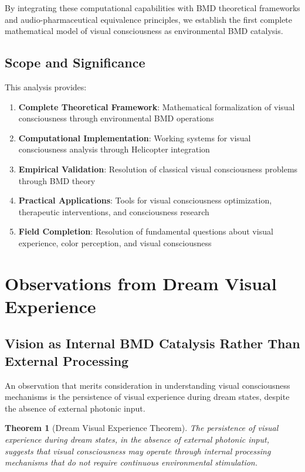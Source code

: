 \documentclass[12pt,a4paper]{article}
\newtheorem{theorem}{Theorem}[section]
\begin{document}
By integrating these computational capabilities with BMD theoretical frameworks and audio-pharmaceutical equivalence principles, we establish the first complete mathematical model of visual consciousness as environmental BMD catalysis.

\subsection{Scope and Significance}

This analysis provides:

\begin{enumerate}
\item \textbf{Complete Theoretical Framework}: Mathematical formalization of visual consciousness through environmental BMD operations
\item \textbf{Computational Implementation}: Working systems for visual consciousness analysis through Helicopter integration
\item \textbf{Empirical Validation}: Resolution of classical visual consciousness problems through BMD theory
\item \textbf{Practical Applications}: Tools for visual consciousness optimization, therapeutic interventions, and consciousness research
\item \textbf{Field Completion}: Resolution of fundamental questions about visual experience, color perception, and visual consciousness
\end{enumerate}

\section{Observations from Dream Visual Experience}

\subsection{Vision as Internal BMD Catalysis Rather Than External Processing}

An observation that merits consideration in understanding visual consciousness mechanisms is the persistence of visual experience during dream states, despite the absence of external photonic input.

\begin{theorem}[Dream Visual Experience Theorem]
The persistence of visual experience during dream states, in the absence of external photonic input, suggests that visual consciousness may operate through internal processing mechanisms that do not require continuous environmental stimulation.
\end{theorem}
\end{document}
